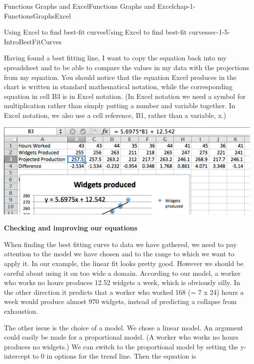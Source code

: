 \documentclass[oneside,10pt,]{book}
\newcommand{\terminology}[1]{\textbf{#1}}
\numberwithin{equation}{section}
\begin{document}
\begin{chapterptx}{Functions Graphs and Excel}{}{Functions Graphs and Excel}{}{}{chap-1-FunctionsGraphsExcel}
\begin{sectionptx}{Using Excel to find best-fit curves}{}{Using Excel to find best-fit curves}{}{}{sec-1-5-IntroBestFitCurves}
\begin{sidebyside}{1}{0.1}{0.1}{0}
\begin{sbspanel}{0.8}
\end{sbspanel}%
\end{sidebyside}%
%
\par
\hypertarget{p-383}{}%
Having found a best fitting line, I want to copy the equation back into my spreadsheet and to be able to compare the values in my data with the projections from my equation.  You should notice that the equation Excel produces in the chart is written in standard mathematical notation, while the corresponding equation in cell B3 is in Excel notation.  (In Excel notation we need a symbol for multiplication rather than simply putting a number and variable together.  In Excel notation, we also use a cell reference, B1, rather than a variable, x.) \leavevmode%
\begin{sidebyside}{1}{0.1}{0.1}{0}%
\begin{sbspanel}{0.8}%
\includegraphics[width=1\linewidth]{images/sec1-5-6.png}
\end{sbspanel}%
\end{sidebyside}%
%
\par
\hypertarget{p-384}{}%
\terminology{Checking and improving our equations}%
\par
\hypertarget{p-385}{}%
When finding the best fitting curve to data we have gathered, we need to pay attention to the model we have chosen and to the range to which we want to apply it.  In our example, the linear fit looks pretty good.  However we should be careful about using it on too wide a domain.  According to our model, a worker who works no hours produces 12.52 widgets a week, which is obviously silly.  In the other direction it predicts that a worker who worked 168 (= 7 x 24) hours a week would produce almost 970 widgets, instead of predicting a collapse from exhaustion.%
\par
\hypertarget{p-386}{}%
The other issue is the choice of a model.  We chose a linear model.  An argument could easily be made for a proportional model.  (A worker who works no hours produces no widgets.)  We can switch to the proportional model by setting the y-intercept to 0 in options for the trend line.  Then the equation is%

\end{sectionptx}
\end{chapterptx}
\end{document}
